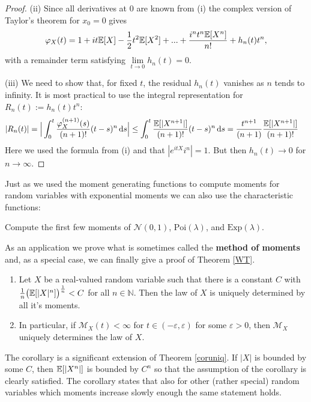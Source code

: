 \begin{proof}[Proof]
	(ii) Since all derivatives at $0$ are known from (i) the complex version of Taylor's theorem for $x_0 =0$ gives
			\begin{align*}
				\varphi_X(t) = 1+  i t \mathbb{E}[X] - \frac{1}{2} t^2 \mathbb{E} [ X^2] + ... + \frac{i^n t^n\mathbb{E} [X^n]}{n!} + h_n(t)t^n,
			\end{align*}
			with a remainder term satisfying $\lim\limits_{t\to 0} h_n(t) = 0$.\smallskip

	(iii) 
			We need to show that, for fixed $t$, the residual $h_n(t)$ vanishes as $n$ tends to infinity. It is most practical to use the integral representation for $R_n(t):=h_n(t)t^n$:
			\begin{align*}
				\lvert R_n(t) \rvert = \Big\lvert \int_0^t \frac{\varphi_X^{(n+1)}(s)}{(n+1)!}(t-s)^n \, \mathrm{d} s \Big\rvert &\leq \int_0^t \frac{\mathbb{E} [ \lvert X^{n+1}\rvert] }{(n+1)!}(t-s)^n \, \mathrm{d} s
				 = \frac{t^{n+1}}{(n+1)} \frac{\mathbb{E}[ \lvert X^{n+1}\rvert ]}{(n+1)!}
			\end{align*}
			Here we used the formula from (i) and that $|e^{itX}i^n|=1$. But then $h_n(t)\to 0$ for $n\to\infty$.
\end{proof}
Just as we used the moment generating functions to compute moments for random variables with exponential moments we can also use the characteristic functions:
\begin{luebung}
	Compute the first few moments of $\mathcal N(0,1)$, $\text{Poi}(\lambda)$, and $\text{Exp}(\lambda)$.
\end{luebung}
As an application we prove what is sometimes called the \textbf{method of moments} and, as a special case, we can finally give a proof of Theorem \ref{WT}.
\begin{laussagewerkzeug}
\begin{corollary}\label{cor:uniqu}
	\begin{enumerate}[label=(\roman*)]
		\item
			Let $X$ be a real-valued random variable such that there is a constant $C$ with $\frac{1}{n} \big( \mathbb{E}[|X|^n ] \big)^{\frac{1}{n}}< C$ for all $n\in \mathbb{N}$. Then the law of $X$ is uniquely determined by all it's moments.
		\item
			In particular, if $\mathcal M_X(t) < \infty$ for $t \in (-\varepsilon,\varepsilon)$ for some $\varepsilon > 0$, then $\mathcal M_X$ uniquely determines the law of $X$.
	\end{enumerate}
\end{corollary}
\end{laussagewerkzeug}
The corollary is a significant extension of Theorem \ref{coruniq}. If $|X|$ is bounded by some $C$, then $\mathbb{E}[|X^n|]$ is bounded by $C^n$ so that the assumption of the corollary is clearly satisfied. The corollary states that also for other (rather special) random variables which moments increase slowly enough the same statement holds.
